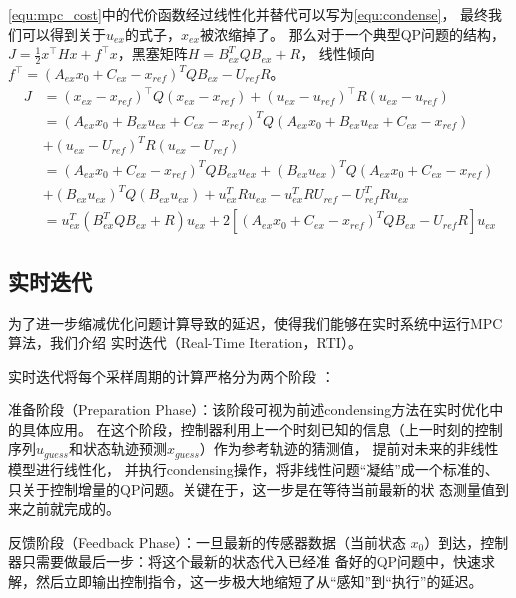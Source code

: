 \autoref{equ:mpc_cost}中的代价函数经过线性化并替代可以写为\autoref{equ:condense}，
最终我们可以得到关于$u_{ex}$的式子，$x_{ex}$被浓缩掉了。
那么对于一个典型QP问题的结构，$J = \frac{1}{2} x^\top H x + f^\top x$，黑塞矩阵$H = B_{ex}^TQB_{ex}+R$，
线性倾向$f^\top = (A_{ex}x_0+ C_{ex}-x_{ref})^TQB_{ex}-U_{ref}R$。
\begin{equation} \label{equ:condense}
    \begin{aligned}
        J &= (x_{ex} - x_{ref})^\top Q (x_{ex} - x_{ref}) + (u_{ex} - u_{ref})^\top R (u_{ex} - u_{ref}) \\
        &= (A_{ex}x_0+B_{ex}u_{ex} + C_{ex}-x_{ref})^TQ(A_{ex}x_0+B_{ex}u_{ex} + C_{ex}-x_{ref}) \\
        &+ (u_{ex}-U_{ref})^TR(u_{ex}-U_{ref}) \\
        &= (A_{ex}x_0+ C_{ex}-x_{ref})^TQB_{ex}u_{ex}+(B_{ex}u_{ex})^TQ(A_{ex}x_0+ C_{ex}-x_{ref}) \\
        &+ (B_{ex}u_{ex})^TQ(B_{ex}u_{ex})+u_{ex}^TRu_{ex}-u_{ex}^TRU_{ref}-U_{ref}^TRu_{ex} \\
        &= u_{ex}^T(B_{ex}^TQB_{ex}+R)u_{ex}+2\left[(A_{ex}x_0+ C_{ex}-x_{ref})^TQB_{ex}-U_{ref}R\right]u_{ex}
    \end{aligned}
\end{equation}

\subsection{实时迭代}

为了进一步缩减优化问题计算导致的延迟，使得我们能够在实时系统中运行MPC算法，我们介绍
实时迭代（Real-Time Iteration，RTI）\cite{Diehl_2002}。

实时迭代将每个采样周期的计算严格分为两个阶段 ：

    准备阶段（Preparation Phase）：该阶段可视为前述condensing方法在实时优化中的具体应用。 
    在这个阶段，控制器利用上一个时刻已知的信息（上一时刻的控制序列$u_{guess}$和状态轨迹预测$x_{guess}$）作为参考轨迹的猜测值，
    提前对未来的非线性模型进行线性化，
    并执行condensing操作，将非线性问题“凝结”成一个标准的、只关于控制增量的QP问题。关键在于，这一步是在等待当前最新的状
    态测量值到来之前就完成的。

    反馈阶段（Feedback Phase）：一旦最新的传感器数据（当前状态 $x_0$​）到达，控制器只需要做最后一步：将这个最新的状态代入已经准
    备好的QP问题中，快速求解，然后立即输出控制指令，这一步极大地缩短了从“感知”到“执行”的延迟。

